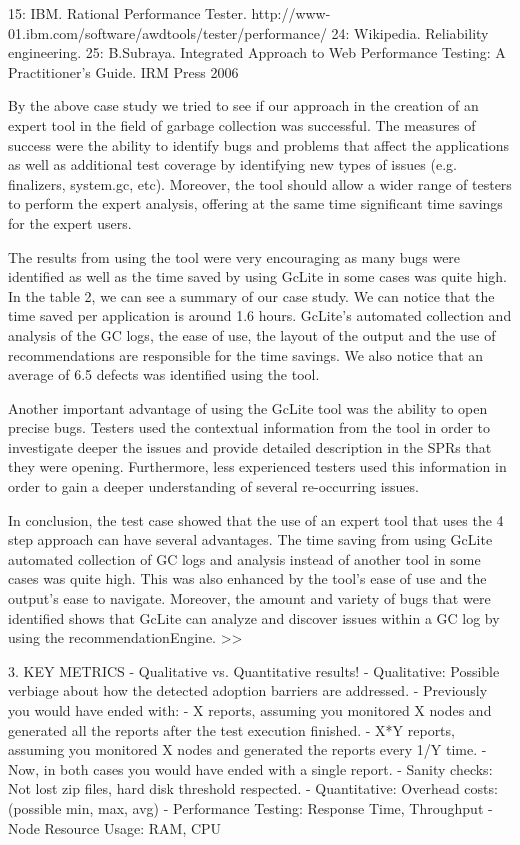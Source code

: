 \documentclass[runningheads,a4paper]{llncs}
\begin{document}
15: IBM. Rational Performance Tester. http://www-01.ibm.com/software/awdtools/tester/performance/ 
24: Wikipedia. Reliability engineering.
25: B.Subraya. Integrated Approach to Web Performance Testing: A Practitioner's Guide. IRM Press 2006

By the above case study we tried to see if our approach in
the creation of an expert tool in the field of garbage collection was successful. The measures of success were the ability to
identify bugs and problems that affect the applications as well as additional
test coverage by identifying new types of issues (e.g. finalizers, system.gc, etc). Moreover, the tool should allow a wider range of testers to perform the expert analysis, offering at the same time significant time savings for the expert users. 

The results from using the tool were very encouraging as
many bugs were identified as well as the time saved by using GcLite in some cases was 
quite high. In the table 2, we can see a summary of our case study. We can notice that 
the time saved per application is around 1.6 hours. GcLite’s automated collection and 
analysis of the GC logs, the ease of use, the layout of the output and the use of 
recommendations are responsible for the time savings. We also notice that an average of 
6.5 defects was identified using the tool.

Another important advantage of using the GcLite tool was
the ability to open precise bugs. Testers used the contextual information from the tool 
in order to investigate deeper the issues and provide detailed description in the SPRs 
that they were opening. Furthermore, less experienced testers used this information in 
order to gain a deeper understanding of several re-occurring issues.

In conclusion, the test case showed that the use of an expert
tool that uses the 4 step approach can have several advantages. The time saving from 
using GcLite automated collection of GC logs and analysis instead of another tool in 
some cases was quite high. This was also enhanced by the tool’s ease of use and the 
output’s ease to navigate. Moreover, the amount and variety of bugs that were identified 
shows that GcLite can analyze and discover issues within a GC log by using the 
recommendationEngine. 
>>

3.	KEY METRICS
- Qualitative vs. Quantitative results!
- Qualitative: Possible verbiage about how the detected adoption barriers are
addressed.
- Previously you would have ended with:
- X reports, assuming you monitored X nodes and generated all the reports after
the test execution finished.
- X*Y reports, assuming you monitored X nodes and generated the reports every
1/Y time.
- Now, in both cases you would have ended with a single report.
- Sanity checks: Not lost zip files, hard disk threshold respected.
- Quantitative: Overhead costs: (possible min, max, avg)
- Performance Testing: Response Time, Throughput
- Node Resource Usage: RAM, CPU
\end{document}

